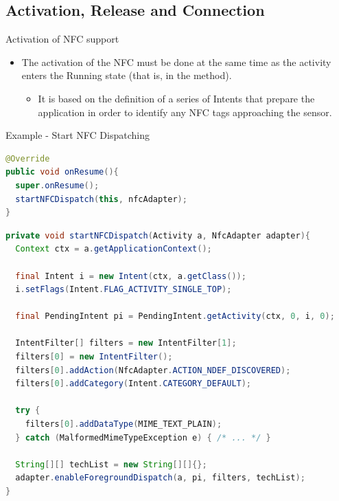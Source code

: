 \documentclass{beamer}
\begin{document}
\subsection{Activation, Release and Connection}
  \begin{frame}{Activation of NFC support}
    \begin{itemize}
      \item The activation of the NFC must be done at the same time as the
      activity enters the Running state (that is, in the  method).
      \begin{itemize}
        \item It is based on the definition of a series of Intents that prepare
        the application in order to identify any NFC tags approaching the
        sensor.
      \end{itemize}
    \end{itemize}

    \begin{exampleblock}{Example - Start NFC Dispatching}
      \begin{lstlisting}[language=Java]
@Override
public void onResume(){
  super.onResume();
  startNFCDispatch(this, nfcAdapter);
}
      \end{lstlisting}
    \end{exampleblock}

    \begin{exampleblock}{\vspace{-10pt}}
      \begin{lstlisting}[language=Java]
private void startNFCDispatch(Activity a, NfcAdapter adapter){
  Context ctx = a.getApplicationContext();
  
  final Intent i = new Intent(ctx, a.getClass());
  i.setFlags(Intent.FLAG_ACTIVITY_SINGLE_TOP);

  final PendingIntent pi = PendingIntent.getActivity(ctx, 0, i, 0);

  IntentFilter[] filters = new IntentFilter[1];
  filters[0] = new IntentFilter();
  filters[0].addAction(NfcAdapter.ACTION_NDEF_DISCOVERED);
  filters[0].addCategory(Intent.CATEGORY_DEFAULT);
        
  try {
    filters[0].addDataType(MIME_TEXT_PLAIN);
  } catch (MalformedMimeTypeException e) { /* ... */ }
  
  String[][] techList = new String[][]{};
  adapter.enableForegroundDispatch(a, pi, filters, techList);
}
      \end{lstlisting}
    \end{exampleblock}
  \end{frame}
\end{document}

